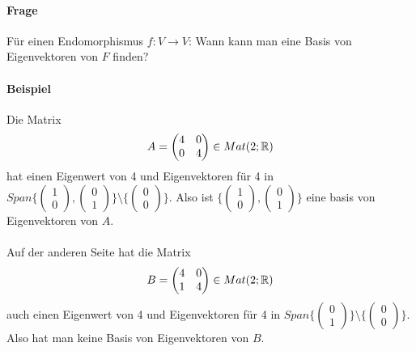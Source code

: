 \paragraph{Frage}
Für einen Endomorphismus $f: V \rightarrow V$: Wann kann man eine Basis von Eigenvektoren von $F$ finden?

\paragraph{Beispiel}
Die Matrix
\begin{align}
A =  \begin{pmatrix} 4 & 0 \\ 0 & 4 \end{pmatrix} \in Mat(2; \mathbb{R})
\end{align}
hat einen Eigenwert von 4 und Eigenvektoren für 4 in $Span\{\begin{pmatrix} 1 \\ 0 \end{pmatrix}, \begin{pmatrix} 0 \\ 1 \end{pmatrix}\} \setminus \{\begin{pmatrix} 0 \\ 0 \end{pmatrix}\}$.
Also ist $\{\begin{pmatrix} 1 \\ 0 \end{pmatrix}, \begin{pmatrix} 0 \\ 1 \end{pmatrix}\}$ eine basis von Eigenvektoren von $A$.\\\\
Auf der anderen Seite hat die Matrix
\begin{align}
B = \begin{pmatrix} 4 & 0 \\ 1 & 4 \end{pmatrix} \in Mat(2; \mathbb{R})
\end{align}
auch einen Eigenwert von 4 und Eigenvektoren für 4 in $Span\{\begin{pmatrix} 0 \\ 1 \end{pmatrix}\} \setminus \{\begin{pmatrix} 0 \\ 0 \end{pmatrix}\}$.
Also hat man keine Basis von Eigenvektoren von $B$.

